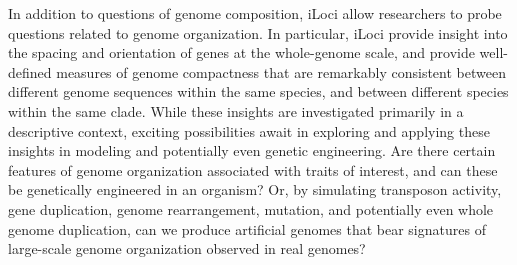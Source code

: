 In addition to questions of genome composition, iLoci allow researchers to probe questions related to genome organization.
In particular, iLoci provide insight into the spacing and orientation of genes at the whole-genome scale, and provide well-defined measures of genome compactness that are remarkably consistent between different genome sequences within the same species, and between different species within the same clade.
While these insights are investigated primarily in a descriptive context, exciting possibilities await in exploring and applying these insights in modeling and potentially even genetic engineering.
Are there certain features of genome organization associated with traits of interest, and can these be genetically engineered in an organism?
Or, by simulating transposon activity, gene duplication, genome rearrangement, mutation, and potentially even whole genome duplication, can we produce artificial genomes that bear signatures of large-scale genome organization observed in real genomes?
